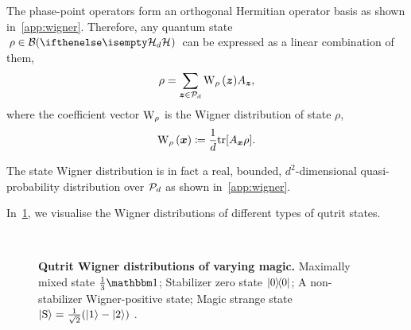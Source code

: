 \documentclass[pra,
aps,
twocolumn,
superscriptaddress,
groupedaddress,
nofootinbib,
reprint
]{revtex4-1}
\begin{document}
The phase-point operators form an orthogonal Hermitian operator basis as shown in~\cref{app:wigner}.
Therefore, any quantum state $\rho \in \cal{B}(\hd)$ can be expressed as a linear combination of them,
\begin{equation}
    \rho = \sum_{\bmz \in \cal{P}_d} \W[\bmz]{\rho} A_{\bmz},
\end{equation}
where the coefficient vector $\W{\rho}$ is the Wigner distribution of state $\rho$,
\begin{equation}\label{eq:wstate}
    \W[\bmx]{\rho} \coloneqq \frac{1}{d}\tr[A_{\bmx} \rho].
\end{equation}

The state Wigner distribution is in fact a real, bounded, $d^2$-dimensional quasi-probability distribution over $\cal{P}_d$ as shown in~\cref{app:wigner}. 

In~\cref{fig:wstate_examples}, we visualise the Wigner distributions of different types of qutrit states.
\begin{figure}%
    \centering
    \hspace{8pt}%
    \\
    \hspace{8pt}%
    \caption{\textbf{Qutrit Wigner distributions of varying magic.} 
     Maximally mixed state $\frac{1}{3}\id$;  Stabilizer zero state $\ketbra{0}{0}$;  A non-stabilizer Wigner-positive state;  Magic strange state $\ket{{\rm{S}}} = \frac{1}{\sqrt{2}}(\ket{1} - \ket{2})$ .
    }%
    \label{fig:wstate_examples}
\end{figure}
\end{document}
